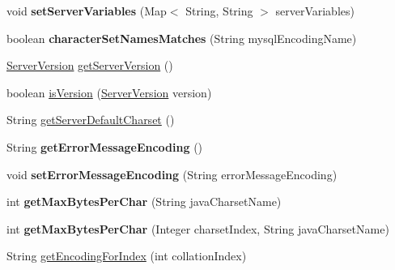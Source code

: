 \begin{DoxyCompactItemize}
void {\bfseries set\+Server\+Variables} (Map$<$ String, String $>$ server\+Variables)
\item 
\mbox{\label{interfacecom_1_1mysql_1_1cj_1_1protocol_1_1_server_session_a17bf8c1aa6316e1a1db91c7b00ebee86}} 
boolean {\bfseries character\+Set\+Names\+Matches} (String mysql\+Encoding\+Name)
\item 
\mbox{\hyperlink{classcom_1_1mysql_1_1cj_1_1_server_version}{Server\+Version}} \mbox{\hyperlink{interfacecom_1_1mysql_1_1cj_1_1protocol_1_1_server_session_a96ad6ba424e7065b39d9b83dae49834a}{get\+Server\+Version}} ()
\item 
boolean \mbox{\hyperlink{interfacecom_1_1mysql_1_1cj_1_1protocol_1_1_server_session_a021c8f114fce23443b9a8b26074b137a}{is\+Version}} (\mbox{\hyperlink{classcom_1_1mysql_1_1cj_1_1_server_version}{Server\+Version}} version)
\item 
String \mbox{\hyperlink{interfacecom_1_1mysql_1_1cj_1_1protocol_1_1_server_session_afeb928036af67a7fff2d45783673c72d}{get\+Server\+Default\+Charset}} ()
\item 
\mbox{\label{interfacecom_1_1mysql_1_1cj_1_1protocol_1_1_server_session_af83c1d2cdc8e37e3c916ee435ff0af71}} 
String {\bfseries get\+Error\+Message\+Encoding} ()
\item 
\mbox{\label{interfacecom_1_1mysql_1_1cj_1_1protocol_1_1_server_session_a05ff2ff3c3265cb245ca9f1ff708d457}} 
void {\bfseries set\+Error\+Message\+Encoding} (String error\+Message\+Encoding)
\item 
\mbox{\label{interfacecom_1_1mysql_1_1cj_1_1protocol_1_1_server_session_a5717509373a607bafcf452136ccd4fe6}} 
int {\bfseries get\+Max\+Bytes\+Per\+Char} (String java\+Charset\+Name)
\item 
\mbox{\label{interfacecom_1_1mysql_1_1cj_1_1protocol_1_1_server_session_a2fb64ef85381ab4a6a7a2c819e5d8a8a}} 
int {\bfseries get\+Max\+Bytes\+Per\+Char} (Integer charset\+Index, String java\+Charset\+Name)
\item 
String \mbox{\hyperlink{interfacecom_1_1mysql_1_1cj_1_1protocol_1_1_server_session_a437ab4e5fb2cdd6cc66f206bce8688cd}{get\+Encoding\+For\+Index}} (int collation\+Index)

\end{DoxyCompactItemize}
